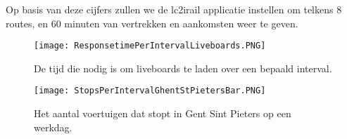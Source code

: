 Op basis van deze cijfers zullen we de lc2irail applicatie instellen om telkens 8 routes, en 60 minuten van vertrekken en aankomsten weer te geven.

\begin{figure}[h]
	\centering
	\texttt{[image: ResponsetimePerIntervalLiveboards.PNG]}
	\caption[Laadtijd liveboards in functie van het overlopen interval]{De tijd die nodig is om liveboards te laden over een bepaald interval.}
	\label{fig:responsetimeperintervalliveboards}
\end{figure}

\begin{figure}[h]
	\centering
	\texttt{[image: StopsPerIntervalGhentStPietersBar.PNG]}
	\caption[Het aantal voertuigen dat stopt in Gent-St-Pieters]{Het aantal voertuigen dat stopt in Gent Sint Pieters op een werkdag.}
	\label{fig:stopsperintervaldetail}
\end{figure}
